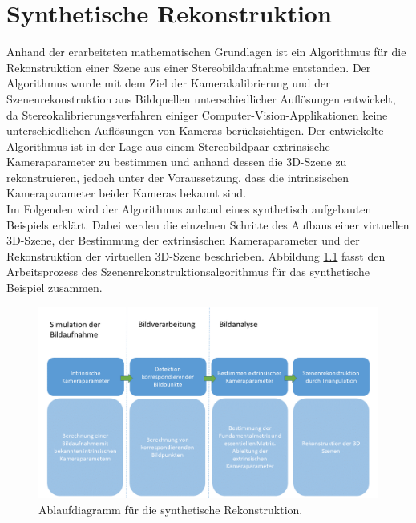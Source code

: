 \chapter{Synthetische Rekonstruktion}
\label{sec:minimal} 

Anhand der erarbeiteten mathematischen Grundlagen ist ein Algorithmus für die Rekonstruktion einer Szene aus einer Stereobildaufnahme entstanden. Der Algorithmus wurde mit dem Ziel der Kamerakalibrierung und der Szenenrekonstruktion aus Bildquellen unterschiedlicher Auflösungen entwickelt, da Stereokalibrierungsverfahren einiger Computer-Vision-Applikationen keine unterschiedlichen Auflösungen von Kameras berücksichtigen. Der entwickelte Algorithmus ist in der Lage aus einem Stereobildpaar extrinsische Kameraparameter zu bestimmen und anhand dessen die 3D-Szene zu rekonstruieren, jedoch unter der Voraussetzung, dass die intrinsischen Kameraparameter beider Kameras bekannt sind.\\

Im Folgenden wird der Algorithmus anhand eines synthetisch aufgebauten Beispiels erklärt. Dabei werden die einzelnen Schritte des Aufbaus einer virtuellen 3D-Szene, der Bestimmung der extrinsischen Kameraparameter und der Rekonstruktion der virtuellen 3D-Szene beschrieben. Abbildung \ref{fig:ArbeitsProzessVirtuell} fasst den Arbeitsprozess des Szenenrekonstruktionsalgorithmus für das synthetische Beispiel zusammen. \\




\begin{figure}[!htb]%
	\centering
	\includegraphics[width=1.\linewidth]{images/NEU_Virtuel_Arbeitsprozess.png}
	\caption[Ablaufdiagram]{Ablaufdiagramm für die synthetische Rekonstruktion.}
	\label{fig:ArbeitsProzessVirtuell}
\end{figure}

